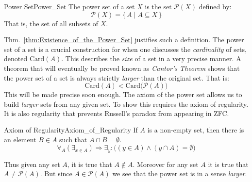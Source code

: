         \begin{fdefinition}{Power Set}{Power_Set}
            The power set of a set $X$ is the set $\mathcal{P}(X)$ defined by:
            \begin{equation*}
                \mathcal{P}(X)=\{\,A\;|\;A\subseteq{X}\,\}
            \end{equation*}
            That is, the set of all subsets of $X$.
        \end{fdefinition}
        Thm.~\ref{thm:Existence_of_the_Power_Set} justifies such a definition.
        The power set of a set is a crucial construction for when one discusses
        the \textit{cardinality} of sets, denoted $\textrm{Card}(A)$. This
        describes the \textit{size} of a set in a very precise manner. A theorem
        that will eventually be proved known as
        \textit{Cantor's Theorem} shows that
        the power set of a set is always strictly \textit{larger} than the
        original set. That is:
        \begin{equation}
            \textrm{Card}(A)<\textrm{Card}\big(\mathcal{P}(A)\big)
        \end{equation}
        This will be made precise soon enough. The axiom of the power set allows
        us to build \textit{larger} sets from any given set. To show this
        requires the axiom of regularity. It is also regularity that prevents
        Russell's paradox from appearing in ZFC.
        \begin{faxiom}{Axiom of Regularity}{Axiom_of_Regularity}
            If $A$ is a non-empty set, then there is an element $B\in{A}$
            such that $A\cap{B}=\emptyset$.
            \begin{equation*}
                \forall_{A}(\exists_{x\in{A}})\Rightarrow
                \exists_{y}:\big((y\in{A})\land(y\cap{A})=\emptyset\big)
            \end{equation*}
        \end{faxiom}
        Thus given any set $A$, it is true that $A\notin{A}$. Moreover for any
        set $A$ it is true that $A\ne\mathcal{P}(A)$. But since
        $A\in\mathcal{P}(A)$ we see that the power set is in a sense
        \textit{larger}.
